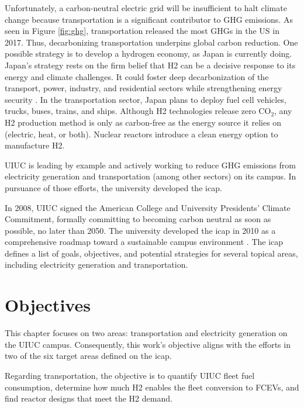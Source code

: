 Unfortunately, a carbon-neutral electric grid will be insufficient to halt climate change because transportation is a significant contributor to \gls{GHG} emissions.
As seen in Figure \ref{fig:ghg}, transportation released the most \glspl{GHG} in the \gls{US} in 2017. Thus, decarbonizing transportation underpins global carbon reduction.
One possible strategy is to develop a hydrogen economy, as Japan is currently doing.
Japan's strategy rests on the firm belief that \gls{H2} can be a decisive response to its energy and climate challenges.
It could foster deep decarbonization of the transport, power, industry, and residential sectors while strengthening energy security \cite{nagashima_japans_2018}.
In the transportation sector, Japan plans to deploy fuel cell vehicles, trucks, buses, trains, and ships.
Although \gls{H2} technologies release zero CO$_2$, any \gls{H2} production method is only as carbon-free as the energy source it relies on (electric, heat, or both).
Nuclear reactors introduce a clean energy option to manufacture \gls{H2}.

\gls{UIUC} is leading by example and actively working to reduce \gls{GHG} emissions from electricity generation and transportation (among other sectors) on its campus.
In pursuance of those efforts, the university developed the \gls{icap}.

In 2008, \gls{UIUC} signed the American College and University Presidents' Climate Commitment, formally committing to becoming carbon neutral as soon as possible, no later than 2050.
The university developed the \gls{icap} in 2010 as a comprehensive roadmap toward a sustainable campus environment \cite{university_of_illinois_at_urbana-champaign_illlinois_2015}.
The \gls{icap} defines a list of goals, objectives, and potential strategies for several topical areas, including electricity generation and transportation.

\section{Objectives}
\label{sec:hydro-objectives}

This chapter focuses on two areas: transportation and electricity generation on the \gls{UIUC} campus.
Consequently, this work's objective aligns with the efforts in two of the six target areas defined on the \gls{icap}.

Regarding transportation, the objective is to quantify UIUC fleet fuel consumption, determine how much \gls{H2} enables the fleet conversion to \glspl{FCEV}, and find reactor designs that meet the \gls{H2} demand.


